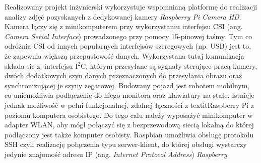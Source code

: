 Realizowany projekt inżynierski wykorzystuje wspomnianą platformę do realizacji analizy zdjęć pozyskanych z dedykowanej kamery \textit{Raspberry Pi Camera HD}. Kamera łączy się z minikomputerem przy wykorzystaniu interfejsu CSI (ang. \textit{Camera Serial Interface}) prowadzonego przy pomocy 15-pinowej taśmy. Tym co odróżnia CSI od innych popularnych interfejsów szeregowych (np. USB) jest to, że zapewnia większą przepustowość danych. Wykorzystana tutaj komunikacja składa się z: interfejsu I$^2$C, którym przesyłane są sygnały sterujące pracą kamery, dwóch dodatkowych szyn danych przeznaczonych do przesyłania obrazu oraz synchronizującej je szyny zegarowej. 
Budowany pojazd jest robotem mobilnym, co uniemożliwia podłączenie do niego monitora oraz klawiatury na stałe. Istnieje jednak możliwość w pełni funkcjonalnej, zdalnej łączności z textit{Raspberry Pi} z poziomu komputera osobistego. Do tego calu należy wyposażyć minikomputer w adapter WLAN, aby mógł połączyć się z bezprzewodową siecią lokalną do której podłączony jest także komputer osobisty. Raspbian umożliwia obsługę protokołu SSH  czyli realizację połączenia typu serwer-klient, do której obsługi wystarczy jedynie znajomość adresu IP (ang. \textit{Internet Protocol Address}) \textit{Raspberry}.
  
